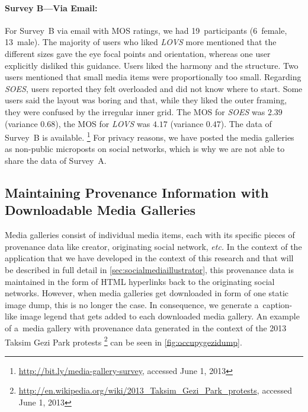 \paragraph{Survey B---Via Email:}

For Survey~B via email with MOS ratings,
we had 19~participants (6~female, 13~male).
The majority of users who liked \emph{LOVS} more
mentioned that the different sizes
gave the eye focal points and orientation,
whereas one user explicitly disliked this guidance.
Users liked the harmony and the structure.
Two users mentioned that small media items were proportionally too small.
Regarding \emph{SOES}, users reported they felt overloaded
and did not know where to start.
Some users said the layout was boring and that,
while they liked the outer framing,
they were confused by the irregular inner grid.
The MOS for \emph{SOES} was $2.39$ (variance $0.68$),
the MOS for \emph{LOVS} was $4.17$ (variance $0.47$).
The data of Survey~B is available.%
\footnote{\url{http://bit.ly/media-gallery-survey},
accessed June 1, 2013}
For privacy reasons, we have posted the media galleries
as non-public microposts on social networks,
which is why we are not able to share the data of Survey~A.

\subsection{Maintaining Provenance Information with Downloadable Media Galleries}

Media galleries consist of individual media items,
each with its specific pieces of provenance data
like creator, originating social network, \emph{etc.}
In the context of the application that we have developed
in the context of this research and
that will be described in full detail in \autoref{sec:socialmediaillustrator},
this provenance data is maintained in the form of HTML hyperlinks
back to the originating social networks.
However, when media galleries get downloaded in form of
one static image dump, this is no longer the case.
In consequence, we generate a~caption-like image legend
that gets added to each downloaded media gallery.
An example of a~media gallery with provenance data
generated in the context of the 2013 Taksim Gezi Park protests%
\footnote{\url{http://en.wikipedia.org/wiki/2013_Taksim_Gezi_Park_protests},
accessed June 1, 2013}
can be seen in \autoref{fig:occupygezidump}.

